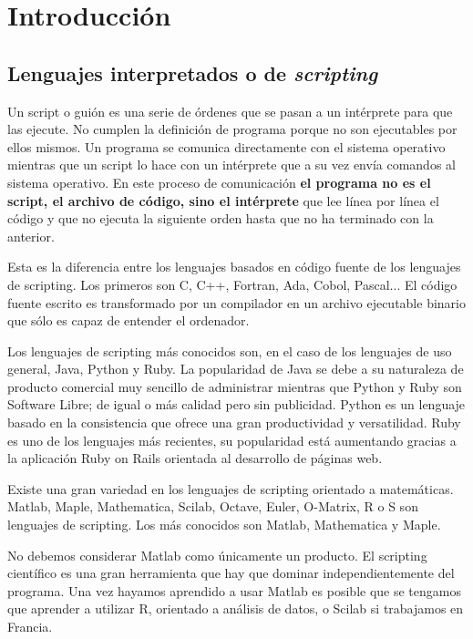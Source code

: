\chapter{Introducción}

\section{Lenguajes interpretados o de
  \emph{scripting}}

Un script o guión es una serie de órdenes que se pasan a un
intérprete para que las ejecute. No cumplen la
definición de programa porque no son ejecutables por ellos mismos. Un
programa se comunica directamente con el sistema operativo mientras
que un script lo hace con un intérprete que a su vez envía comandos al
sistema operativo. En este proceso de comunicación \textbf{el programa
no es el script, el archivo de código, sino el intérprete} que lee
línea por línea el código y que no ejecuta la siguiente orden hasta
que no ha terminado con la anterior.

Esta es la diferencia entre los lenguajes basados en código fuente de
los lenguajes de scripting. Los primeros son C, C++, Fortran, Ada,
Cobol, Pascal... El código fuente escrito es transformado por un
compilador en un archivo ejecutable binario que sólo
es capaz de entender el ordenador.

Los lenguajes de scripting más conocidos son, en el caso de los
lenguajes de uso general, Java, Python y Ruby. La popularidad de Java
se debe a su naturaleza de producto comercial muy sencillo de
administrar mientras que Python y Ruby son Software Libre; de igual o
más calidad pero sin publicidad.  Python es un lenguaje basado en la
consistencia que ofrece una gran productividad y versatilidad.  Ruby
es uno de los lenguajes más recientes, su popularidad está aumentando
gracias a la aplicación Ruby on Rails orientada al desarrollo de
páginas web.

Existe una gran variedad en los lenguajes de scripting orientado a
matemáticas. Matlab, Maple, Mathematica, Scilab, Octave, Euler,
O-Matrix, R o S son lenguajes de scripting.  Los más conocidos son
Matlab, Mathematica y Maple.

No debemos considerar Matlab como únicamente un producto. El scripting
científico es una gran herramienta que hay que dominar
independientemente del programa. Una vez hayamos aprendido a usar
Matlab es posible que se tengamos que aprender a utilizar R, orientado
a análisis de datos, o Scilab si trabajamos en Francia.


